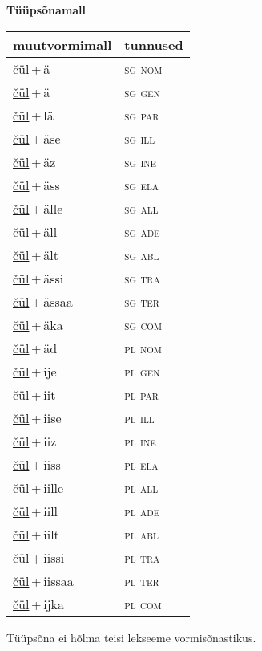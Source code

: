
\vspace{1.8em}
\begin{minipage}{\textwidth}
\textbf{Tüüpsõnamall \,}\\

\begin{sideways}
\begin{tabular}{l l}
muutvormimall & tunnused \\
\hline
\underline{čül}\,+\,ä & \textsc{ sg nom } \\
\underline{čül}\,+\,ä & \textsc{ sg gen } \\
\underline{čül}\,+\,lä & \textsc{ sg par } \\
\underline{čül}\,+\,äse & \textsc{ sg ill } \\
\underline{čül}\,+\,äz & \textsc{ sg ine } \\
\underline{čül}\,+\,äss & \textsc{ sg ela } \\
\underline{čül}\,+\,älle & \textsc{ sg all } \\
\underline{čül}\,+\,äll & \textsc{ sg ade } \\
\underline{čül}\,+\,ält & \textsc{ sg abl } \\
\underline{čül}\,+\,ässi & \textsc{ sg tra } \\
\underline{čül}\,+\,ässaa & \textsc{ sg ter } \\
\underline{čül}\,+\,äka & \textsc{ sg com } \\
\underline{čül}\,+\,äd & \textsc{ pl nom } \\
\underline{čül}\,+\,ije & \textsc{ pl gen } \\
\underline{čül}\,+\,iit & \textsc{ pl par } \\
\underline{čül}\,+\,iise & \textsc{ pl ill } \\
\underline{čül}\,+\,iiz & \textsc{ pl ine } \\
\underline{čül}\,+\,iiss & \textsc{ pl ela } \\
\underline{čül}\,+\,iille & \textsc{ pl all } \\
\underline{čül}\,+\,iill & \textsc{ pl ade } \\
\underline{čül}\,+\,iilt & \textsc{ pl abl } \\
\underline{čül}\,+\,iissi & \textsc{ pl tra } \\
\underline{čül}\,+\,iissaa & \textsc{ pl ter } \\
\underline{čül}\,+\,ijka & \textsc{ pl com } \\
\end{tabular}
\end{sideways}
\label{tab:tüüpsõnamall-čülä}

\end{minipage}

 
\vspace{1em}
\noindent Tüüpsõna ei hõlma teisi lekseeme vormi\-sõnastikus.
